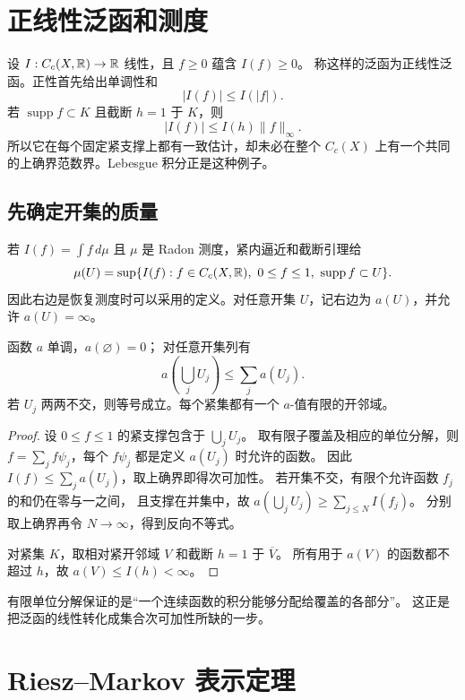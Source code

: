 \section{正线性泛函和测度}
\label{sec:positive-radon-functionals}

设 \(I:C_c(X,\mathbb{R})\to\mathbb{R}\) 线性，且 \(f\ge0\) 蕴含 \(I(f)\ge0\)。
称这样的泛函为正线性泛函。正性首先给出单调性和
\[
 |I(f)|\le I(|f|).
\]
若 \(\operatorname{supp}f\subset K\) 且截断 \(h=1\) 于 \(K\)，则
\[
 |I(f)|\le I(h)\|f\|_\infty. \tag{*}
\]
所以它在每个固定紧支撑上都有一致估计，却未必在整个 \(C_c(X)\)
上有一个共同的上确界范数界。Lebesgue 积分正是这种例子。

\subsection{先确定开集的质量}

若 \(I(f)=\int f\,d\mu\) 且 \(\mu\) 是 Radon 测度，紧内逼近和截断引理给
\[
 \mu(U)=\sup\{I(f):f\in C_c(X,\mathbb{R}),\ 0\le f\le1,\
                       \operatorname{supp}f\subset U\}.
\]
因此右边是恢复测度时可以采用的定义。对任意开集 \(U\)，记右边为
\(a(U)\)，并允许 \(a(U)=\infty\)。

\begin{lemma}\label{lem:open-mass-properties}
函数 \(a\) 单调，\(a(\varnothing)=0\)；
对任意开集列有
\[
 a\left(\bigcup_jU_j\right)\le\sum_j a(U_j).
\]
若 \(U_j\) 两两不交，则等号成立。每个紧集都有一个 \(a\)-值有限的开邻域。
\end{lemma}
\begin{proof}
设 \(0\le f\le1\) 的紧支撑包含于 \(\bigcup_jU_j\)。
取有限子覆盖及相应的单位分解，则
\(f=\sum_j f\psi_j\)，每个 \(f\psi_j\) 都是定义 \(a(U_j)\) 时允许的函数。
因此 \(I(f)\le\sum_j a(U_j)\)，取上确界即得次可加性。
若开集不交，有限个允许函数 \(f_j\) 的和仍在零与一之间，
且支撑在并集中，故 \(a(\bigcup_jU_j)\ge\sum_{j\le N}I(f_j)\)。
分别取上确界再令 \(N\to\infty\)，得到反向不等式。

对紧集 \(K\)，取相对紧开邻域 \(V\) 和截断 \(h=1\) 于 \(\overline V\)。
所有用于 \(a(V)\) 的函数都不超过 \(h\)，故 \(a(V)\le I(h)<\infty\)。
\end{proof}

有限单位分解保证的是“一个连续函数的积分能够分配给覆盖的各部分”。
这正是把泛函的线性转化成集合次可加性所缺的一步。

\section{Riesz--Markov 表示定理}
\label{sec:riesz-markov-proof}

